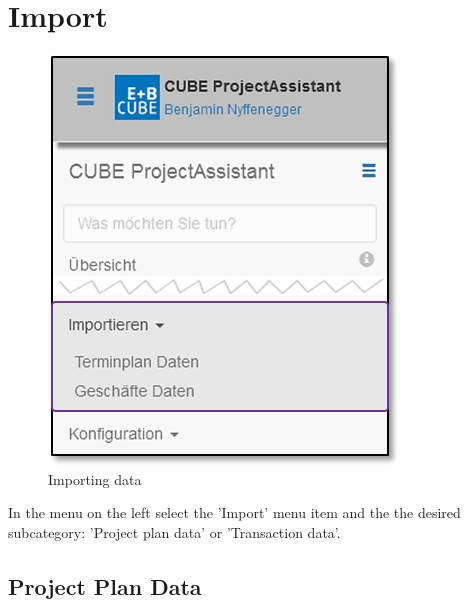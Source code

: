 
\clearpage
\section{Import}

\begin{figure}   %
  \vspace{-35pt}      %
  \begin{center}
    \includegraphics[width=1\linewidth]{../chapters/12_Importieren/pictures/12_Menu_Importieren.jpg}
  \end{center}
  \vspace{-20pt}
  \caption{Importing data}
  \vspace{-10pt}
\end{figure}

In the menu on the left select the 'Import' menu item and the the desired subcategory: 'Project plan data' or 'Transaction data'.
\vspace{6.5cm}

\subsection{Project Plan Data}
\label{bkm:Ref445411998}

